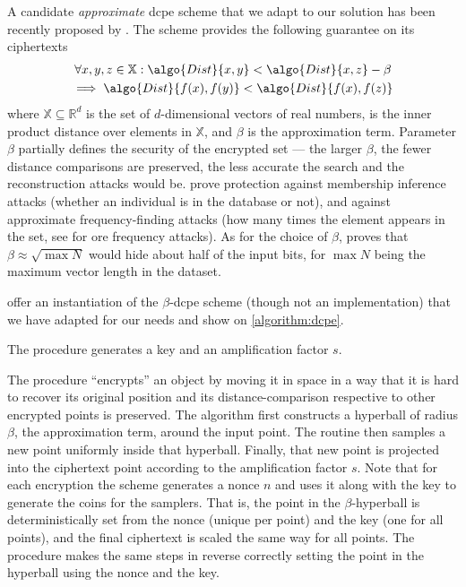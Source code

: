 		A candidate \emph{approximate} \acrshort{dcpe} scheme that we adapt to our solution has been recently proposed by \textcite{dcpe}.
		The scheme provides the following guarantee on its ciphertexts
		\begin{multline*}
			\forall x, y, z \in \mathbb{X} : \algo{Dist}{x, y} < \algo{Dist}{x, z} - \beta \\
			\implies \algo{Dist}{f(x), f(y)} < \algo{Dist}{f(x), f(z)}
		\end{multline*}
		where $\mathbb{X} \subseteq \mathbb{R}^d$ is the set of $d$-dimensional vectors of real numbers,  is the inner product distance over elements in $\mathbb{X}$, and $\beta$ is the approximation term.
		Parameter $\beta$ partially defines the security of the encrypted set --- the larger $\beta$, the fewer distance comparisons are preserved, the less accurate the search and the reconstruction attacks would be.
		\textcite{dcpe} prove protection against membership inference attacks \cite{memebership-inference-attacks-knn} (whether an individual is in the database or not), and against approximate frequency-finding attacks (how many times the element appears in the set, see \cite{leakage-abuse-grubs-2017} for \acrshort{ore} frequency attacks).
		As for the choice of $\beta$, \textcite{dcpe} proves that $\beta \approx \sqrt{\max N}$ would hide about half of the input bits, for $\max N$ being the maximum vector length in the dataset.

		

		\textcite{dcpe} offer an instantiation of the $\beta$-\acrshort{dcpe} scheme (though not an implementation) that we have adapted for our needs and show on \cref{algorithm:dcpe}.

		The  procedure generates a key \key{} and an amplification factor $s$.

		The  procedure ``encrypts'' an object by moving it in space in a way that it is hard to recover its original position and its distance-comparison respective to other encrypted points is preserved.
		The algorithm first constructs a hyperball of radius $\beta$, the approximation term, around the input point.
		The routine then samples a new point uniformly inside that hyperball.
		Finally, that new point is projected into the ciphertext point according to the amplification factor $s$.
		Note that for each encryption the scheme generates a nonce $n$ and uses it along with the key \key{} to generate the coins for the samplers.
		That is, the point in the $\beta$-hyperball is deterministically set from the nonce (unique per point) and the key (one for all points), and the final ciphertext is scaled the same way for all points.
		The  procedure makes the same steps in reverse correctly setting the point in the hyperball using the nonce and the key.


